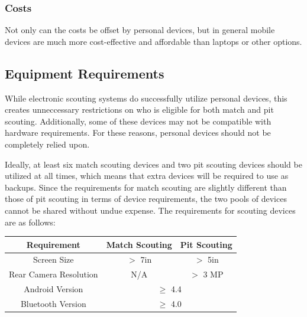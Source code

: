 \documentclass{report}
\begin{document}
\subsubsection*{Costs}

Not only can the costs be offset by personal devices, but in general mobile devices are much more cost-effective and affordable than laptops or other options.

\subsection{Equipment Requirements}

While electronic scouting systems do successfully utilize personal devices, this creates unneccessary restrictions on who is eligible for both match and pit scouting. Additionally, some of these devices may not be compatible with hardware requirements. For these reasons, personal devices should not be completely relied upon. \newline

Ideally, at least six match scouting devices and two pit scouting devices should be utilized at all times, which means that extra devices will be required to use as backups. Since the requirements for match scouting are slightly different than those of pit scouting in terms of device requirements, the two pools of devices cannot be shared without undue expense. The requirements for scouting devices are as follows: 

\begin{center}
 \begin{tabular}{||c|c|c||} 
 \hline
 Requirement & Match Scouting & Pit Scouting \\  [0.5ex] 
 \hline \hline
 Screen Size & $>$ 7in & $>$ 5in \\ 
 \hline
 Rear Camera Resolution & N/A & $>$ 3 MP \\ 
 \hline
 Android Version & \multicolumn{2}{|c||}{$\geq$ 4.4}  \\
 \hline
 Bluetooth Version & \multicolumn{2}{|c||}{$\geq$ 4.0} \\  [1ex] 
 \hline
\end{tabular}
\end{center}
\end{document}
